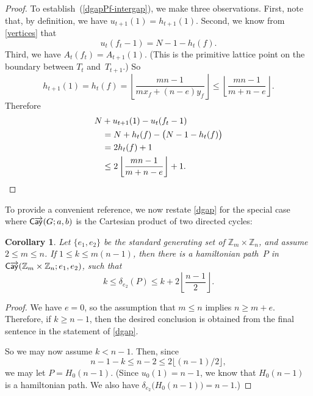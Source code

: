 \documentclass[11pt]{amsart}
\newtheorem{cor}[equation]{Corollary}
\theoremstyle{definition}
\newcounter{case}
\numberwithin{case}{startcases}
\numberwithin{equation}{section}
\newcommand{\Z}{\mathbb{Z}}  %
\newcommand{\cayd}{\mathop{\mathsf{C}\mkern-1mu\overrightarrow{\mathsf{ay}}}}
\begin{document}
\begin{proof}
		To establish~(\ref{dgapPf-intergap}), we make three observations. First, note that, by definition, we have $u_{t+1}(1) = h_{t+1}(1)$. Second, we know from \cref{vertices} that 
		\[ u_t(f_t - 1) = N - 1 - h_t(f) .\]
		Third, we have $A_t(f_t) = A_{t+1}(1)$. (This is the primitive lattice point on the boundary between $T_t$ and~$T_{t + 1}$.) So
		\[ h_{t+1}(1) 
		= h_t(f) 
		= \left\lfloor \frac{mn - 1}{m x_f + (n - e) y_f} \right\rfloor
		\le \left\lfloor \frac{mn - 1}{m + n - e} \right\rfloor
		. \]
		Therefore
		\begin{align*} N &+ u_{t+1}(1) - u_t(f_t - 1)
			\\&= N + h_t(f) - \bigl( N - 1 - h_t(f) \bigr)
			\\&= 2 h_t(f) + 1
			\\&\le 2 \left\lfloor \frac{mn - 1}{m + n - e} \right\rfloor + 1
			. \qedhere \end{align*}
	\end{proof}
	
	To provide a convenient reference, we now restate \cref{dgap} for the special case where $\cayd(G; a,b)$ is the Cartesian product of two directed cycles:
	
	\begin{cor} \label{dgapCartProd}
		Let $\{e_1, e_2\}$ be the standard generating set of $\Z_m \times \Z_n$, and assume $2 \le m \le n$. If $1 \le k \le m(n - 1)$, then there is a hamiltonian path~$P$ in $\cayd(\Z_m \times \Z_n; e_1, e_2)$, such that
		\[ k \le \delta_{e_2}(P) \le k + 2 \left\lfloor \frac{n - 1}{2} \right\rfloor . \]
	\end{cor}
	
	\begin{proof}
		We have $e = 0$, so the assumption that $m \le n$ implies $n \ge m + e$.  Therefore, if $k \ge n-1$, then the desired conclusion is obtained from the final sentence in the statement of \cref{dgap}.
		
		So we may now assume $k < n-1$. Then, since 
		\[ n - 1 - k \le n - 2 \le 2 \lfloor (n-1)/2 \rfloor , \]
		we may let $P = H_0(n-1)$. (Since $u_0(1) = n - 1$, we know that $H_0(n-1)$ is a hamiltonian path. We also have $\delta_{e_2} \bigl( H_0(n-1) \bigr) = n-1$.)
	\end{proof}
	
	
	
	
\end{document}
